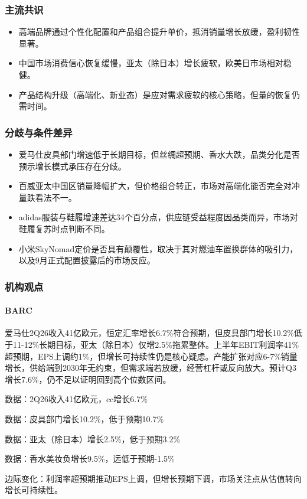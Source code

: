 \documentclass[11pt]{ctexart}
\begin{document}
\subsubsection*{主流共识}
\begin{itemize}
  \item 高端品牌通过个性化配置和产品组合提升单价，抵消销量增长放缓，盈利韧性显著。
  \item 中国市场消费信心恢复缓慢，亚太（除日本）增长疲软，欧美日市场相对稳健。
  \item 产品结构升级（高端化、新业态）是应对需求疲软的核心策略，但量的恢复仍需时间。
\end{itemize}
\subsubsection*{分歧与条件差异}
\begin{itemize}
  \item 爱马仕皮具部门增速低于长期目标，但丝绸超预期、香水大跌，品类分化是否预示增长模式承压存在分歧。
  \item 百威亚太中国区销量降幅扩大，但价格组合转正，市场对高端化能否完全对冲量跌看法不一。
  \item adidas服装与鞋履增速差达34个百分点，供应链受益程度因品类而异，市场对鞋履复苏时点判断不同。
  \item 小米SkyNomad定价是否具有颠覆性，取决于其对燃油车置换群体的吸引力，以及9月正式配置披露后的市场反应。
\end{itemize}
\subsubsection*{机构观点}
\paragraph{BARC} 爱马仕2Q26收入41亿欧元，恒定汇率增长6.7\%符合预期，但皮具部门增长10.2\%低于11-12\%长期目标，亚太（除日本）仅增2.5\%拖累整体。上半年EBIT利润率41\%超预期，EPS上调约1\%，但增长可持续性仍是核心疑虑。产能扩张对应6-7\%销量增长，供给端到2030年无约束，但需求端若放缓，经营杠杆或反向放大。预计Q3增长7.6\%，仍不足以证明回到高个位数区间。
{\small\color{refgray}数据：2Q26收入41亿欧元，cc增长6.7\%\par}
{\small\color{refgray}数据：皮具部门增长10.2\%，低于预期10.7\%\par}
{\small\color{refgray}数据：亚太（除日本）增长2.5\%，低于预期3.2\%\par}
{\small\color{refgray}数据：香水美妆负增长9.5\%，远低于预期-1.5\%\par}
{\small\color{refgray}边际变化：利润率超预期推动EPS上调，但增长预期下调，市场关注点从估值转向增长可持续性。\par}
\end{document}
